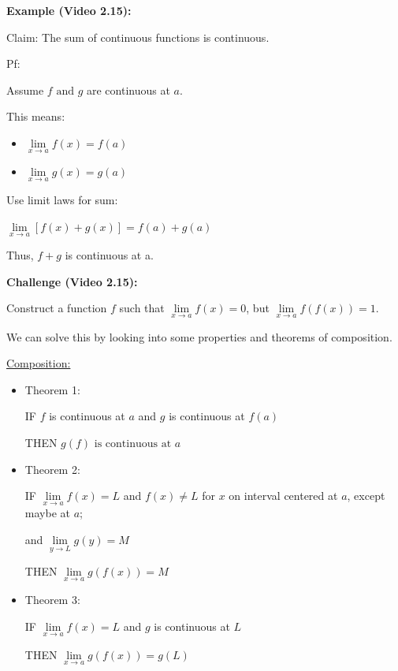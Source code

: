 \documentclass[11pt]{article}
\begin{document}
\textbf{Example (Video 2.15):} 

Claim: The sum of continuous functions is continuous.
\bigskip

Pf:

Assume \(f \text{ and } g\) are continuous at \(a\).

This means:
\begin{itemize}
    \item $\lim\limits_{x \to a} f(x) = f(a)$
    \item $\lim\limits_{x \to a} g(x) = g(a)$
\end{itemize}

Use limit laws for sum:
\bigskip

$\lim\limits_{x \to a} [f(x) + g(x)] = f(a) + g(a)$
\bigskip

Thus, \(f + g\) is continuous at a.
\bigskip

\noindent
\textbf{Challenge (Video 2.15):}

Construct a function \(f\) such that $\lim\limits_{x \to a} f(x) = 0$, but $\lim\limits_{x \to a} f(f(x)) = 1$.
\bigskip

We can solve this by looking into some properties and theorems of composition.
\bigskip

\underline{Composition:}
\begin{itemize}
    \item Theorem 1:
        
        IF \(f\) is continuous at \(a\) and \(g\) is continuous at \(f(a)\)
        
        THEN \(g(f) \text{ is continuous at } a\)
        
    \item Theorem 2:
    
        IF $\lim\limits_{x \to a} f(x) = L$ and $f(x) \neq L$ for \(x\) on interval centered at \(a\), except maybe at \(a\);

        and $\lim\limits_{y \to L} g(y) = M$
        
        THEN $\lim\limits_{x \to a} g(f(x)) = M$
        
    \item Theorem 3:
    
        IF  $\lim\limits_{x \to a} f(x) = L$ and \(g\) is continuous at \(L\)
        
        THEN  $\lim\limits_{x \to a} g(f(x)) = g(L)$
        
\end{itemize}
\bigskip
\end{document}
